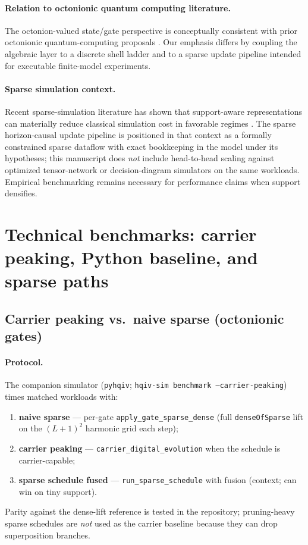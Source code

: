 \documentclass[11pt,a4paper]{article}
\theoremstyle{remark}
\begin{document}
\paragraph{Relation to octonionic quantum computing literature.}
The octonion-valued state/gate perspective is conceptually consistent with prior octonionic quantum-computing proposals \cite{freedman2019,baez2002octonions,dixon2020octonionic}. Our emphasis differs by coupling the algebraic layer to a discrete shell ladder and to a sparse update pipeline intended for executable finite-model experiments.

\paragraph{Sparse simulation context.}
Recent sparse-simulation literature has shown that support-aware representations can materially reduce classical simulation cost in favorable regimes \cite{sun2025,sparsesim2024}. The sparse horizon-causal update pipeline is positioned in that context as a formally constrained sparse dataflow with exact bookkeeping in the model under its hypotheses; this manuscript does \emph{not} include head-to-head scaling against optimized tensor-network or decision-diagram simulators on the same workloads. Empirical benchmarking remains necessary for performance claims when support densifies.

\section{Technical benchmarks: carrier peaking, Python baseline, and sparse paths}
\label{sec:benchmarks}

\subsection{Carrier peaking vs.\ naive sparse (octonionic gates)}
\label{sec:benchmark-carrier}

\paragraph{Protocol.}
The companion simulator (\texttt{pyhqiv}; \texttt{hqiv-sim benchmark --carrier-peaking}) times matched workloads with:
\begin{enumerate}\itemsep0.15em
  \item \textbf{naive sparse} --- per-gate \texttt{apply\_gate\_sparse\_dense} (full \texttt{denseOfSparse} lift on the $(L+1)^2$ harmonic grid each step);
  \item \textbf{carrier peaking} --- \texttt{carrier\_digital\_evolution} when the schedule is carrier-capable;
  \item \textbf{sparse schedule fused} --- \texttt{run\_sparse\_schedule} with fusion (context; can win on tiny support).
\end{enumerate}
Parity against the dense-lift reference is tested in the repository; pruning-heavy sparse schedules are \emph{not} used as the carrier baseline because they can drop superposition branches.
\end{document}
